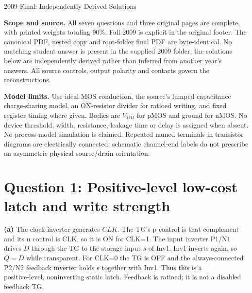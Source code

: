 \documentclass[10pt]{article}
\begin{document}
\begin{center}{\Large 2009 Final: Independently Derived Solutions}\end{center}
\textbf{Scope and source.} All seven questions and three original pages are complete, with printed weights totaling 90\%. Fall 2009 is explicit in the original footer. The canonical PDF, nested copy and root-folder final PDF are byte-identical. No matching student answer is present in the supplied 2009 folder; the solutions below are independently derived rather than inferred from another year's answers. All source controls, output polarity and contacts govern the reconstructions.

\textbf{Model limits.} Use ideal MOS conduction, the source's lumped-capacitance charge-sharing model, an ON-resistor divider for ratioed writing, and fixed register timing where given. Bodies are $V_{DD}$ for pMOS and ground for nMOS. No device threshold, width, resistance, leakage time or delay is assigned when absent. No process-model simulation is claimed. Repeated named terminals in transistor diagrams are electrically connected; schematic channel-end labels do not prescribe an asymmetric physical source/drain orientation.

\section*{Question 1: Positive-level low-cost latch and write strength}
\textbf{(a)} The clock inverter generates $\overline{CLK}$. The TG's p control is that complement and its n control is CLK, so it is ON for CLK=1. The input inverter P1/N1 drives $\bar D$ through the TG to the storage input $s$ of Inv1. Inv1 inverts again, so $Q=D$ while transparent. For CLK=0 the TG is OFF and the always-connected P2/N2 feedback inverter holds s together with Inv1. Thus this is a $\boxed{\text{positive-level, noninverting static latch}}$. Feedback is ratioed; it is not a disabled feedback TG.
\end{document}
